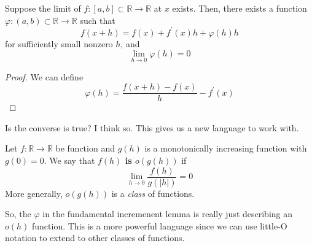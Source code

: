   \begin{lemma}
    Suppose the limit of $f: [a, b] \subset \mathbb{R} \to \mathbb{R}$ at $x$ exists. Then, there exists a function $\varphi: (a, b) \subset \mathbb{R} \to \mathbb{R}$ such that 
    \begin{equation}
      f(x + h) = f(x) + f^\prime (x) h + \varphi(h) h
    \end{equation}
    for sufficiently small nonzero $h$, and 
    \begin{equation}
      \lim_{h \to 0} \varphi(h) = 0
    \end{equation}
  \end{lemma}
  \begin{proof}
    We can define 
    \begin{equation}
      \varphi(h) = \frac{f(x + h) - f(x)}{h} - f^\prime (x)
    \end{equation}
  \end{proof} 

  Is the converse is true? I think so. This gives us a new language to work with. 

  \begin{definition}
    Let $f: \mathbb{R} \to \mathbb{R}$ be function and $g(h)$ is a monotonically increasing function with $g(0) = 0$. We say that \textbf{$f(h)$ is $o(g(h))$} if 
    \begin{equation}
      \lim_{h \to 0} \frac{f(h)}{g(|h|)} = 0
    \end{equation}
    More generally, $o(g(h))$ is a \textit{class} of functions. 
  \end{definition} 
  
  So, the $\varphi$ in the fundamental incremenent lemma is really just describing an $o(h)$ function. This is a more powerful language since we can use little-O notation to extend to other classes of functions. 


